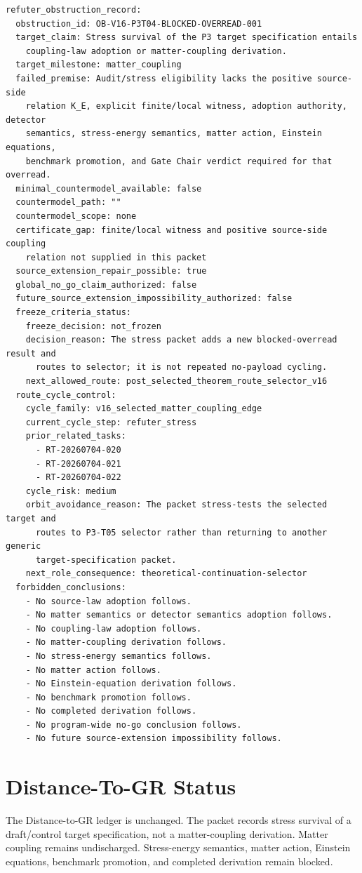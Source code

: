 \documentclass[11pt]{article}
\begin{document}
\begin{verbatim}
refuter_obstruction_record:
  obstruction_id: OB-V16-P3T04-BLOCKED-OVERREAD-001
  target_claim: Stress survival of the P3 target specification entails
    coupling-law adoption or matter-coupling derivation.
  target_milestone: matter_coupling
  failed_premise: Audit/stress eligibility lacks the positive source-side
    relation K_E, explicit finite/local witness, adoption authority, detector
    semantics, stress-energy semantics, matter action, Einstein equations,
    benchmark promotion, and Gate Chair verdict required for that overread.
  minimal_countermodel_available: false
  countermodel_path: ""
  countermodel_scope: none
  certificate_gap: finite/local witness and positive source-side coupling
    relation not supplied in this packet
  source_extension_repair_possible: true
  global_no_go_claim_authorized: false
  future_source_extension_impossibility_authorized: false
  freeze_criteria_status:
    freeze_decision: not_frozen
    decision_reason: The stress packet adds a new blocked-overread result and
      routes to selector; it is not repeated no-payload cycling.
    next_allowed_route: post_selected_theorem_route_selector_v16
  route_cycle_control:
    cycle_family: v16_selected_matter_coupling_edge
    current_cycle_step: refuter_stress
    prior_related_tasks:
      - RT-20260704-020
      - RT-20260704-021
      - RT-20260704-022
    cycle_risk: medium
    orbit_avoidance_reason: The packet stress-tests the selected target and
      routes to P3-T05 selector rather than returning to another generic
      target-specification packet.
    next_role_consequence: theoretical-continuation-selector
  forbidden_conclusions:
    - No source-law adoption follows.
    - No matter semantics or detector semantics adoption follows.
    - No coupling-law adoption follows.
    - No matter-coupling derivation follows.
    - No stress-energy semantics follows.
    - No matter action follows.
    - No Einstein-equation derivation follows.
    - No benchmark promotion follows.
    - No completed derivation follows.
    - No program-wide no-go conclusion follows.
    - No future source-extension impossibility follows.
\end{verbatim}

\section{Distance-To-GR Status}

The Distance-to-GR ledger is unchanged. The packet records stress survival of
a draft/control target specification, not a matter-coupling derivation. Matter
coupling remains undischarged. Stress-energy semantics, matter action,
Einstein equations, benchmark promotion, and completed derivation remain
blocked.
\end{document}
